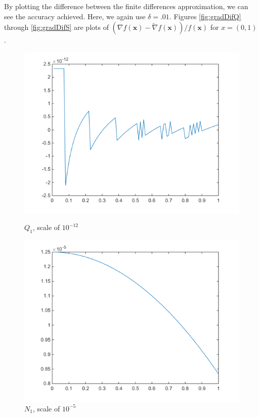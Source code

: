 \documentclass[11pt,letterpaper]{article}
\begin{document}
By plotting the difference between the finite differences approximation, we can see the accuracy achieved. Here, we again use $\delta = .01$. Figures \ref{fig:gradDifQ} through \ref{fig:gradDifS} are plots of $(\nabla f(\mathbf{x}) - \tilde{\nabla} f(\mathbf{x}))/f(\mathbf{x})$ for $x=(0,1)$.

\begin{figure}[!htb]
  \includegraphics[width=\linewidth]{figures/gradDifQ.png}
  \caption{$Q_1$, scale of $10^{-12}$}\label{fig:gradDifQ}
\endminipage\hfill
{}
  \includegraphics[width=\linewidth]{figures/gradDifN.png}
  \caption{$N_1$, scale of $10^{-5}$}\label{fig:gradDifN}
\endminipage\hfill
{}

\end{figure}
\end{document}

